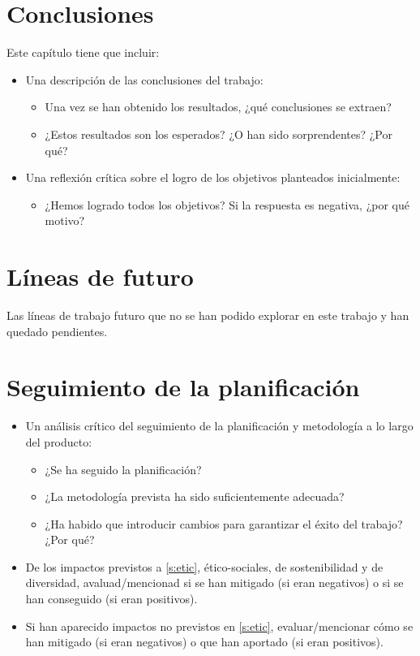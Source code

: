 \documentclass[IB,BIB]{TFUOC}%
\begin{document}
\section{Conclusiones}
Este capítulo tiene que incluir:
\begin{itemize}
\item Una descripción de las conclusiones del trabajo:
\begin{itemize}
    \item Una vez se han obtenido los resultados, ¿qué conclusiones se extraen?
    \item ¿Estos resultados son los esperados? ¿O han sido sorprendentes? ¿Por qué? 
\end{itemize}
\item Una reflexión crítica sobre el logro de los objetivos planteados inicialmente:
\begin{itemize}
    \item ¿Hemos logrado todos los objetivos? Si la respuesta es negativa, ¿por qué motivo?
\end{itemize}
\end{itemize}


\section{Líneas de futuro}
Las líneas de trabajo futuro que no se han podido explorar en este trabajo y han quedado pendientes.

\section{Seguimiento de la planificación}


\begin{itemize}
\item 
Un análisis crítico del seguimiento de la planificación y metodología a lo largo del producto:
\begin{itemize}
    \item ¿Se ha seguido la planificación?
    \item ¿La metodología prevista ha sido suficientemente adecuada?
    \item ¿Ha habido que introducir cambios para garantizar el éxito del trabajo? ¿Por qué? 
\end{itemize}
\item De los impactos previstos a \ref{s:etic}, ético-sociales, de sostenibilidad y de diversidad, avaluad/mencionad si se han mitigado (si eran negativos) o si se han conseguido (si eran positivos). 
\item Si han aparecido impactos no previstos en \ref{s:etic}, evaluar/mencionar cómo se han mitigado (si eran negativos) o que han aportado (si eran positivos).
\end{itemize}
\end{document}
